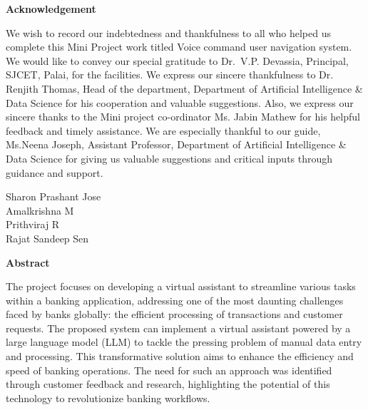 \newpage
\thispagestyle{empty}
\begin{center}
  \vspace*{1cm}
  \textbf{\large Acknowledgement}
\end{center}
We wish to record our indebtedness and thankfulness to all who helped us complete this Mini Project work titled Voice command user navigation system. We would like to convey our special gratitude to Dr.~V.P. Devassia, Principal, SJCET, Palai, for the facilities. We express our sincere thankfulness to Dr. Renjith Thomas, Head of the department, Department of Artificial Intelligence \& Data Science for his cooperation and valuable suggestions. Also, we express our sincere thanks to the Mini project co-ordinator Ms. Jabin Mathew for his helpful feedback and timely assistance.
We are especially thankful to our guide, Ms.Neena Joseph, Assistant Professor, Department of Artificial Intelligence \& Data Science for giving us valuable suggestions and critical inputs through guidance and support.
 \\
\begin{flushright}
Sharon Prashant Jose\\
Amalkrishna M \\
Prithviraj R \\
Rajat Sandeep Sen
\end{flushright}

\newpage
\thispagestyle{empty}
\begin{center}
  \textbf{\large Abstract}
\end{center}
The project focuses on developing a virtual assistant to streamline various tasks within a banking application, addressing one of the most daunting challenges faced by banks globally: the efficient processing of transactions and customer requests. The proposed system can implement a virtual assistant powered by a large language model (LLM) to tackle the pressing problem of manual data entry and processing. This transformative solution aims to enhance the efficiency and speed of banking operations. The need for such an approach was identified through customer feedback and research, highlighting the potential of this technology to revolutionize banking workflows.


